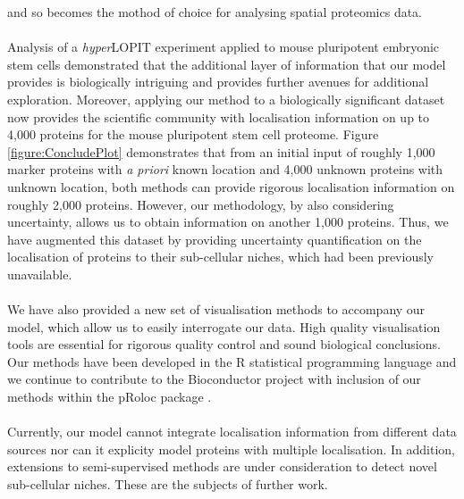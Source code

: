\documentclass[12pt,english]{article}
\begin{document}
and so becomes the mothod of choice for analysing spatial proteomics data.
\\
\\
Analysis of a \textit{hyper}LOPIT experiment applied to mouse pluripotent embryonic stem cells
demonstrated that the additional layer  of information that our model provides is biologically intriguing
and provides further avenues for additional exploration. Moreover, applying
our method to a biologically significant dataset now provides the scientific community
with localisation information on up to 4,000 proteins for the mouse pluripotent
stem cell proteome. Figure \ref{figure:ConcludePlot} demonstrates that from an initial input of
roughly 1,000 marker proteins with \textit{a priori} known location and 4,000 unknown proteins
with unknown location, both methods can provide rigorous
localisation information on roughly 2,000 proteins. However, our methodology, by also
considering uncertainty, allows us to obtain information on another 1,000 proteins.
Thus, we have augmented this dataset by providing uncertainty quantification on the
localisation of proteins to their sub-cellular niches, which had been previously unavailable.
\\
\\
We have also provided a new set of visualisation methods to accompany our
model, which allow us to easily interrogate our data. High quality visualisation tools are
essential for rigorous quality control and sound biological conclusions.
Our methods have been developed in the R statistical programming language and
we continue to contribute to the Bioconductor project \citep{Bioconductor::2004, Huber::2015} with
inclusion of our methods within the pRoloc package \citep{pRoloc:2014}.
\\
\\
Currently, our model cannot integrate localisation information
from different data sources nor can it explicity model proteins with multiple
localisation. In addition, extensions to semi-supervised methods
are under consideration to detect novel sub-cellular
niches. These are the subjects of further work.
\end{document}
